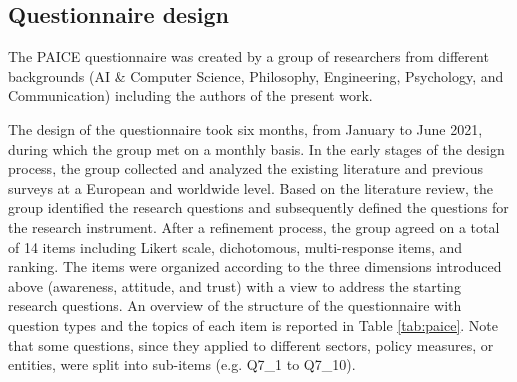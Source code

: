 \documentclass{article}
\begin{document}


\subsection{Questionnaire design}
The PAICE questionnaire was created
by a group of researchers from different backgrounds (AI \& Computer Science, Philosophy, Engineering, Psychology, and Communication) including the authors of the present work. 

The design of the questionnaire took six months, from January to June 2021, during which the group met on a monthly basis. In the early stages of the design process, the group collected and analyzed the existing literature and previous surveys at a European and worldwide level. Based on the literature review, the group identified the research questions and subsequently defined the questions for the research instrument. 
After a refinement process, the group agreed on a total of 14 items including Likert scale, dichotomous, multi-response items, and ranking. The items were organized according to the three dimensions introduced above (awareness, attitude, and trust) with a view to address the starting research questions. An overview of the structure of the questionnaire with question types and the topics of each item is reported in Table \ref{tab:paice}. 
Note that some questions, since they applied to different sectors, policy measures, or entities, were split into sub-items (e.g. Q7\_1 to Q7\_10). 
\end{document}
